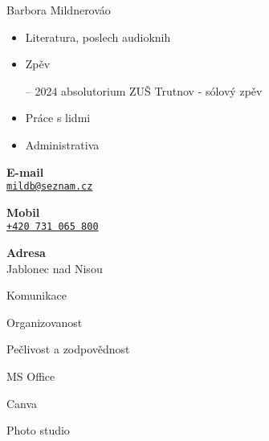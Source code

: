 \documentclass{article}
\begin{document}
\begin{cv}[avatar]{Barbora Mildnerová}{\color{white}o}
\begin{itemize}
	\item Literatura, poslech audioknih
	\item Zpěv \par {\footnotesize -- 2024 absolutorium ZUŠ Trutnov - sólový zpěv}
	\item Práce s lidmi
	\item Administrativa
\end{itemize}



\begin{cvitem}[Envelope][4]
    \textbf{E-mail}\\
    \href{mailto:mildb@seznam.cz}{\texttt{mildb@seznam.cz}}
\end{cvitem}

\cvseparator[3]
\begin{cvitem}[Phone][4]
    \textbf{Mobil}\\
    \href{tel:+420731065800}{\texttt{+420 731 065 	800}}
\end{cvitem}

\cvseparator[3]
\begin{cvitem}[Home][4]
    \textbf{Adresa}\\
    Jablonec nad Nisou
\end{cvitem}



\begin{cvitem}
    Komunikace
\end{cvitem}

\cvseparator
\begin{cvitem}
    Organizovanost
\end{cvitem}

\cvseparator
\begin{cvitem}
    Pečlivost a zodpovědnost
\end{cvitem}

\cvseparator
\begin{cvitem}
    MS Office
\end{cvitem}

\cvseparator
\begin{cvitem}
    Canva
\end{cvitem}

\cvseparator
\begin{cvitem}
    Photo studio
\end{cvitem}


\end{cv}
\end{document}
